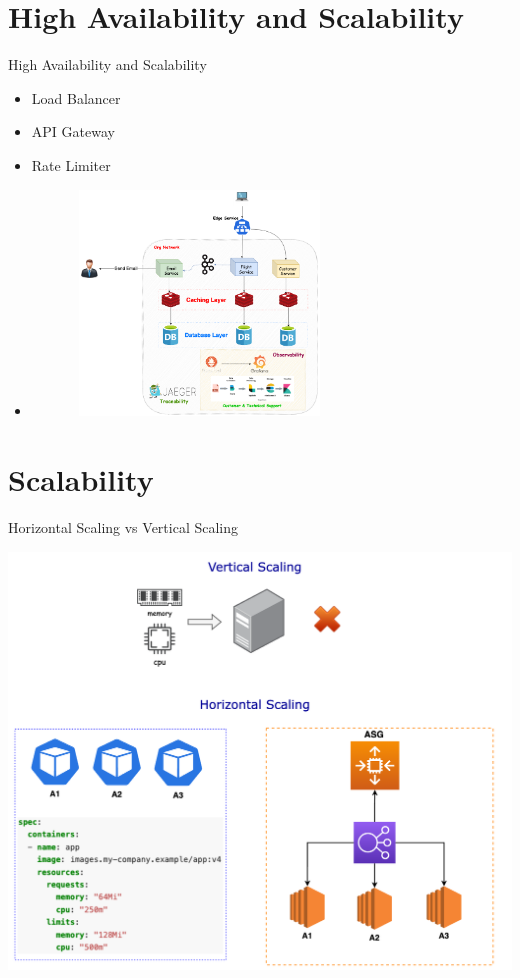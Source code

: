 \documentclass{beamer}
\begin{document}
\section{High Availability and Scalability}
\begin{frame}{High Availability and Scalability}
  \begin{itemize}
    \item Load Balancer
    \item API Gateway
    \item Rate Limiter
    \item[] 
    		\begin{center}
   	 		\includegraphics[width=0.7\textwidth, height=60mm, scale=2]{img/hld-latest.png}
  		\end{center}
  	\end{itemize}
\end{frame}

\section{Scalability}
\begin{frame}{Horizontal Scaling vs Vertical Scaling}
	\begin{center}  
  		\includegraphics[scale = 0.3]{img/scaling.png}
  	\end{center}
\end{frame}
\end{document}
